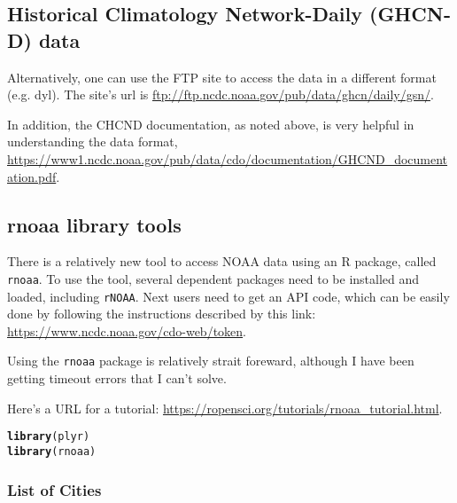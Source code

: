 \documentclass{article}\usepackage[]{graphicx}\usepackage[]{color}
\makeatletter
\newcommand{\hlstd}[1]{\textcolor[rgb]{0.345,0.345,0.345}{#1}}%
\newcommand{\hlkwd}[1]{\textcolor[rgb]{0.737,0.353,0.396}{\textbf{#1}}}%
\newenvironment{kframe}{%
 \def\at@end@of@kframe{}%
 \ifinner\ifhmode%
  \def\at@end@of@kframe{\end{minipage}}%
  \begin{minipage}{\columnwidth}%
 \fi\fi%
 \def\FrameCommand##1{\hskip\@totalleftmargin \hskip-\fboxsep
 \colorbox{shadecolor}{##1}\hskip-\fboxsep
     \hskip-\linewidth \hskip-\@totalleftmargin \hskip\columnwidth}%
 \MakeFramed {\advance\hsize-\width
   \@totalleftmargin\z@ \linewidth\hsize
   \@setminipage}}%
 {\par\unskip\endMakeFramed%
 \at@end@of@kframe}
\newenvironment{knitrout}{}{} %
\makeatother
\begin{document}
\subsection{Historical Climatology Network-Daily (GHCN‐D) data}

Alternatively, one can use the FTP site to access the data in a different format (e.g. dyl). The site's url is \url{ftp://ftp.ncdc.noaa.gov/pub/data/ghcn/daily/gsn/}. 

In addition, the CHCND documentation, as noted above, is very helpful in understanding the data format, \url{https://www1.ncdc.noaa.gov/pub/data/cdo/documentation/GHCND_documentation.pdf}.

\subsection{rnoaa library tools}

There is a relatively new tool to access NOAA data using an R package, called \texttt{rnoaa}. To use the tool, several dependent packages need to be installed and loaded, including \texttt{rNOAA}. Next users need to get an API code, which can be easily done by following the instructions described by this link: \url{https://www.ncdc.noaa.gov/cdo-web/token}.

Using the \texttt{rnoaa} package is relatively strait foreward, although I have been getting timeout errors that I can't solve. 

Here's a URL for a tutorial: \url{https://ropensci.org/tutorials/rnoaa_tutorial.html}.

\begin{knitrout}
\color{fgcolor}\begin{kframe}
\begin{alltt}
\hlkwd{library}\hlstd{(plyr)}
\hlkwd{library}\hlstd{(rnoaa)}
\end{alltt}
\end{kframe}
\end{knitrout}



\subsubsection{List of Cities}
\end{document}
